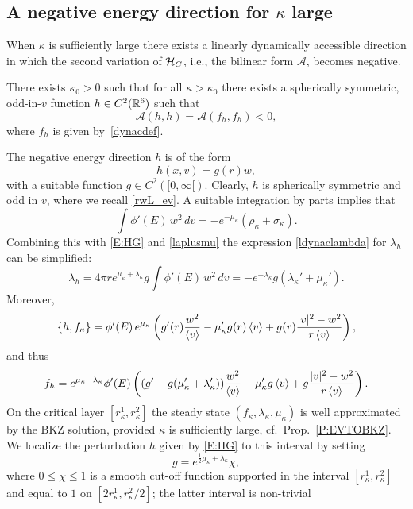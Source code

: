 \documentclass[11pt]{article}
\begin{document}
\subsection{A negative energy direction for $\kappa$ large}
%
%
When $\kappa$ is sufficiently large there exists a
linearly dynamically accessible direction in which
the second variation of ${\cal H}_C$, i.e.,
the bilinear form $\mathcal A$, becomes negative.
%
%
\begin{theorem}\label{T:NEGATIVEA}
  There exists $\kappa_0>0$ such that for all $\kappa>\kappa_0$
  there exists a spherically symmetric, odd-in-$v$ function
  $h\in C^2(\mathbb R^6)$ such that
  \[
  \mathcal A (h,h) = \mathcal A (f_h,f_h) < 0,
  \]
  where $f_h$ is given by~\eqref{dynacdef}.
\end{theorem}
%
%
The negative energy direction $h$ is of the form
\begin{equation}\label{E:HG}
  h(x,v) = g(r) w,
\end{equation}
with a suitable function $g\in C^2([0,\infty[)$.
Clearly, $h$ is spherically symmetric and odd in $v$,
where we recall \eqref{rwL_ev}.
A suitable integration by parts implies that
\begin{equation}\label{intpar1}
  \int \phi'(E)\,w^2\,dv
  = - e^{-\mu_\kappa}(\rho_\kappa + \sigma_\kappa).
\end{equation}
Combining this with \eqref{E:HG} and  \eqref{laplusmu} the expression
\eqref{ldynaclambda} for $\lambda_h$
can be simplified:
\[
\lambda_{h} = 4\pi r  e^{\mu_\kappa+\lambda_\kappa}g \int \phi'(E)\,w^2\,dv 
= - e^{-\lambda_\kappa}g\left(\lambda_\kappa'+\mu_\kappa'\right).
\]
Moreover,
\[
\{h,f_\kappa\}
= \phi'(E)\, e^{\mu_\kappa}
\left( g'(r)\frac{w^2}{\left\langle v\right\rangle} - \mu_\kappa'g(r)\left\langle v\right\rangle
+ g(r)\frac{|v|^2-w^2}{r\left\langle v\right\rangle}\right),
\]
and thus
\begin{align*}
  f_{h} = e^{\mu_\kappa-\lambda_\kappa}
  \phi'(E)\left((g'-g(\mu_\kappa'+\lambda_\kappa'))
  \frac{w^2}{\left\langle v\right\rangle}-\mu_\kappa'g\left\langle v\right\rangle + g\frac{|v|^2-w^2}{r\left\langle v\right\rangle}\right).
\end{align*}
On the critical layer $[r_\kappa^1, r_\kappa^2]$ the steady state
$(f_\kappa,\lambda_\kappa,\mu_\kappa)$ is well approximated by the BKZ
solution, provided $\kappa$
is sufficiently large, cf.\ Prop.~\ref{P:EVTOBKZ}. 
We localize the perturbation $h$ given by \eqref{E:HG}
to this interval by setting
\[
g = e^{\frac12\mu_\kappa+\lambda_\kappa}\chi,
\]
where $0\leq \chi\leq 1$
is a smooth cut-off function supported in the interval
$[r_\kappa^1, r_\kappa^2]$ and equal to $1$ on
$[2 r_\kappa^1, r_\kappa^2/2]$; the latter interval is non-trivial
\end{document}
